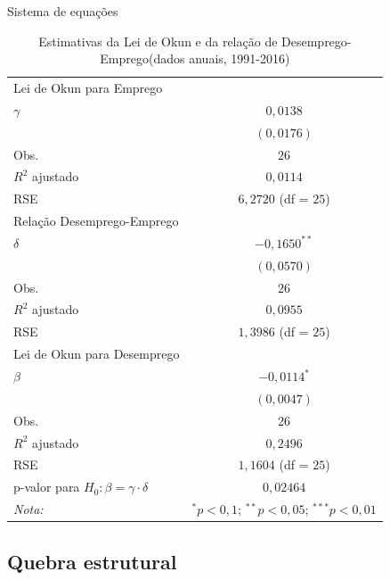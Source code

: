 \documentclass[11pt]{beamer}
\begin{document}
\begin{frame}{Sistema de equações}

\begin{table}[H]
\centering
\caption*{\scriptsize Estimativas da Lei de Okun e da relação de Desemprego-Emprego(dados anuais, 1991-2016)}
\label{tab:sur}
\begin{tabular}{@{}lc@{}}
\toprule
Lei de Okun para Emprego &  \\
$\gamma$ & $0,0138$ \\
 & $(0,0176)$ \\
Obs. & $26$ \\
$R^2$ ajustado & $0,0114$ \\
RSE & $6,2720$ (df = $25$) \\ \midrule
Relação Desemprego-Emprego &  \\
$\delta$ & $-0,1650^{**}$ \\
 & $(0,0570)$ \\
Obs. & $26$ \\
$R^2$ ajustado & $0,0955$ \\
RSE & $1,3986$ (df = $25$) \\ \midrule
Lei de Okun para Desemprego &  \\
$\beta$ & $-0,0114^{*}$ \\
 & $(0,0047)$ \\
Obs. & 26 \\
$R^2$ ajustado & $0,2496$ \\
RSE & $1,1604$ (df = $25$) \\ \midrule
p-valor para $H_0: \beta = \gamma \cdot \delta$ & $0,02464$ \\ \midrule
\textit{Nota:} & $^*p < 0,1$; $^{**}p < 0,05$; $^{***}p < 0,01$ \\ \bottomrule
\end{tabular}
\end{table}

\end{frame}

\subsection{Quebra estrutural}
\end{document}
